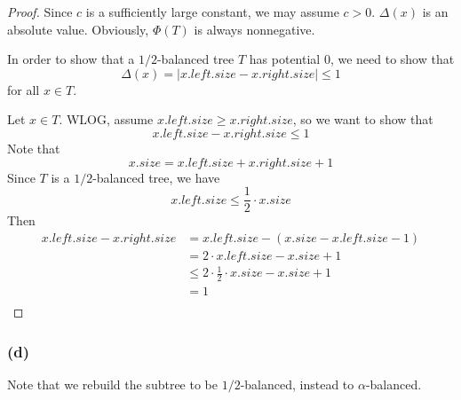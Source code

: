 \begin{proof}
    Since $c$ is a sufficiently large constant, 
    we may assume $c > 0$.
    $\Delta(x)$ is an absolute value.
    Obviously, $\Phi(T)$ is always nonnegative. 

    In order to show that a $1/2$-balanced tree $T$ has potential $0$,
    we need to show that 
    \begin{equation*}
        \Delta(x) = | x.left.size - x.right.size | \leq 1
    \end{equation*}
    for all $x \in T$.

    Let $x \in T$.
    WLOG, assume $x.left.size \geq x.right.size$,
    so we want to show that 
    \begin{equation*}
        x.left.size - x.right.size \leq 1
    \end{equation*}
    Note that 
    \begin{equation*}
        x.size = x.left.size + x.right.size + 1
    \end{equation*}
    Since $T$ is a $1/2$-balanced tree,
    we have 
    \begin{equation*}
        x.left.size \leq \frac{1}{2} \cdot x.size
    \end{equation*}
    Then
    \begin{equation*}
    \begin{split}
        x.left.size - x.right.size 
        & = x.left.size - (x.size - x.left.size - 1) \\
        & = 2 \cdot x.left.size - x.size + 1 \\
        & \leq 2 \cdot \frac{1}{2} \cdot x.size - x.size + 1 \\
        & = 1 \\
    \end{split}
    \end{equation*}
\end{proof}

\subsubsection*{(d)}

Note that we rebuild the subtree to be $1/2$-balanced,
instead to $\alpha$-balanced.


